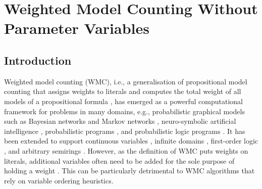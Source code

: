 \chapter{Weighted Model Counting Without Parameter Variables}

\section{Introduction}

Weighted model counting (WMC), i.e., a generalisation of propositional model
counting that assigns weights to literals and computes the total weight of all
models of a propositional formula \citep{DBLP:journals/ai/ChaviraD08}, has
emerged as a powerful computational framework for problems in many domains,
e.g., probabilistic graphical models such as Bayesian networks and Markov
networks
\citep{DBLP:conf/ecai/BartKLM16,DBLP:conf/ijcai/ChaviraD05,DBLP:conf/sat/ChaviraD06,DBLP:conf/kr/Darwiche02,DBLP:conf/aaai/SangBK05},
neuro-symbolic artificial intelligence \citep{DBLP:conf/icml/XuZFLB18},
probabilistic programs \citep{DBLP:journals/pacmpl/HoltzenBM20}, and
probabilistic logic programs \citep{DBLP:journals/tplp/FierensBRSGTJR15}. It has
been extended to support continuous variables \citep{DBLP:conf/ijcai/BellePB15},
infinite domains \citep{DBLP:conf/aaai/Belle17}, first-order logic
\citep{DBLP:journals/cacm/GogateD16,DBLP:conf/ijcai/BroeckTMDR11}, and arbitrary
semirings \citep{DBLP:journals/ijar/BelleR20,DBLP:journals/japll/KimmigBR17}.
However, as the definition of WMC puts weights on literals, additional variables
often need to be added for the sole purpose of holding a weight
\citep{DBLP:conf/ecai/BartKLM16,DBLP:conf/ijcai/ChaviraD05,DBLP:conf/sat/ChaviraD06,DBLP:conf/kr/Darwiche02,DBLP:conf/aaai/SangBK05}.
This can be particularly detrimental to WMC algorithms that rely on variable
ordering heuristics.


